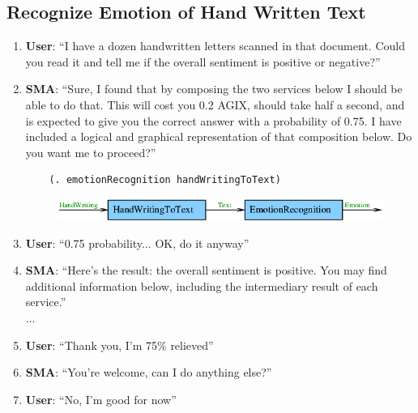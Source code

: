 \documentclass[]{article}
\begin{document}
\subsection{Recognize Emotion of Hand Written Text}
\begin{enumerate}
\item \textbf{User}: ``I have a dozen handwritten letters scanned in
  that document.  Could you read it and tell me if the overall
  sentiment is positive or negative?''
\item \textbf{SMA}: ``Sure, I found that by composing the two services
  below I should be able to do that.  This will cost you 0.2 AGIX,
  should take half a second, and is expected to give you the correct
  answer with a probability of 0.75.  I have included a logical and
  graphical representation of that composition below.  Do you want me
  to proceed?''
  \begin{verbatim}
    (. emotionRecognition handWritingToText)
  \end{verbatim}
  \begin{figure}[H]
    \centering
    \includegraphics[scale=0.45]{figs/HandWritingEmotionRecognition.png}
  \end{figure}
\item \textbf{User}: ``0.75 probability... OK, do it anyway''
\item \textbf{SMA}: ``Here's the result: the overall sentiment is
  positive.  You may find additional information below, including the
  intermediary result of each service.''\\
  $\dots$
\item \textbf{User}: ``Thank you, I'm 75\% relieved''
\item \textbf{SMA}: ``You're welcome, can I do anything else?''
\item \textbf{User}: ``No, I'm good for now''
\end{enumerate}
\end{document}
